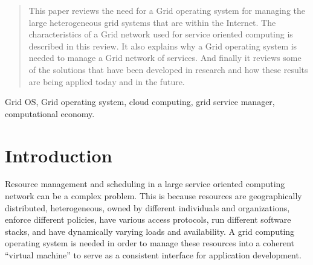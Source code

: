 \documentclass[conference]{IEEEtran}
\begin{document}




\maketitle


\begin{abstract}
This paper reviews the need for a Grid operating system for managing the large heterogeneous grid systems that are within the Internet. The characteristics of a Grid network used for service oriented computing is described in this review. It also explains why a Grid operating system is needed to manage a Grid network of services. And finally it reviews some of the solutions that have been developed in research and how these results are being applied today and in the future. 
\end{abstract}

\begin{IEEEkeywords}
Grid OS, Grid operating system, cloud computing, grid service manager, computational economy.
\end{IEEEkeywords}

%
\IEEEpeerreviewmaketitle

\section{\textbf{Introduction}}
Resource management and scheduling in a large service oriented computing network can be a complex problem. This is because resources are geographically distributed, heterogeneous, owned by different individuals and organizations, enforce different policies, have various access protocols, run different software stacks, and have dynamically varying loads and availability.\cite{economygrid} A grid computing operating system is needed in order to manage these resources into a coherent ``virtual machine'' to serve as a consistent interface for application development. 
\end{document}
